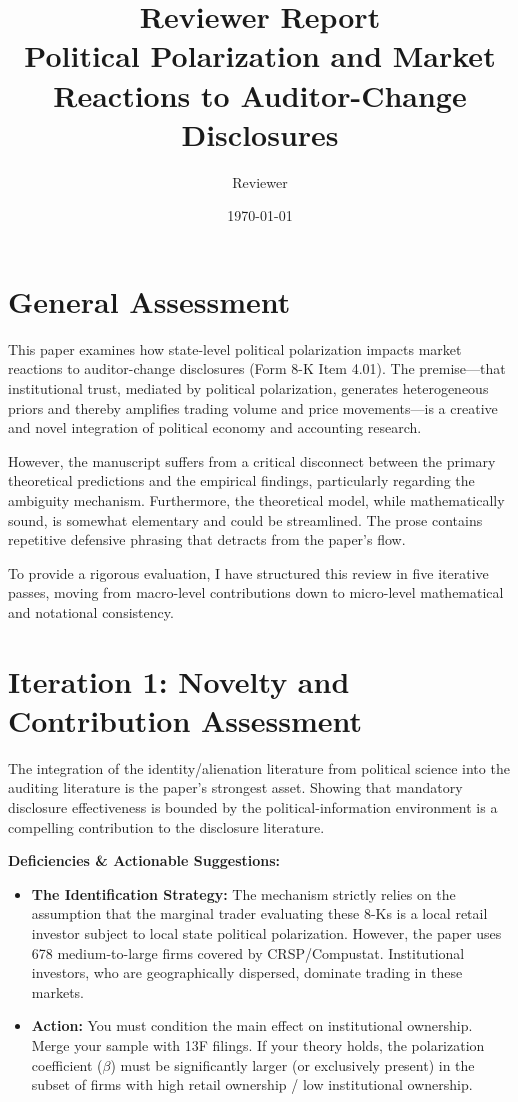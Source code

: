 \documentclass[12pt]{article}
\title{\textbf{Reviewer Report}\\ \Large Political Polarization and Market Reactions to Auditor-Change Disclosures}
\author{Reviewer}
\date{\today}
\begin{document}
\maketitle
\doublespacing

\section*{General Assessment}
This paper examines how state-level political polarization impacts market reactions to auditor-change disclosures (Form 8-K Item 4.01). The premise---that institutional trust, mediated by political polarization, generates heterogeneous priors and thereby amplifies trading volume and price movements---is a creative and novel integration of political economy and accounting research. 

However, the manuscript suffers from a critical disconnect between the primary theoretical predictions and the empirical findings, particularly regarding the ambiguity mechanism. Furthermore, the theoretical model, while mathematically sound, is somewhat elementary and could be streamlined. The prose contains repetitive defensive phrasing that detracts from the paper's flow. 

To provide a rigorous evaluation, I have structured this review in five iterative passes, moving from macro-level contributions down to micro-level mathematical and notational consistency.


\section{Iteration 1: Novelty and Contribution Assessment}

The integration of the identity/alienation literature from political science into the auditing literature is the paper's strongest asset. Showing that mandatory disclosure effectiveness is bounded by the political-information environment is a compelling contribution to the disclosure literature.

\textbf{Deficiencies \& Actionable Suggestions:}
\begin{itemize}
    \item \textbf{The Identification Strategy:} The mechanism strictly relies on the assumption that the marginal trader evaluating these 8-Ks is a local retail investor subject to local state political polarization. However, the paper uses 678 medium-to-large firms covered by CRSP/Compustat. Institutional investors, who are geographically dispersed, dominate trading in these markets. 
    \item \textbf{Action:} You must condition the main effect on institutional ownership. Merge your sample with 13F filings. If your theory holds, the polarization coefficient ($\beta$) must be significantly larger (or exclusively present) in the subset of firms with high retail ownership / low institutional ownership. 
\end{itemize}
\end{document}
